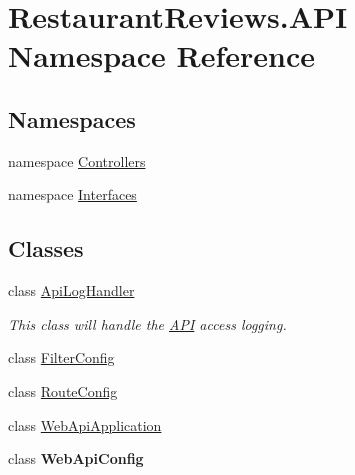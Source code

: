 \hypertarget{namespace_restaurant_reviews_1_1_a_p_i}{}\section{Restaurant\+Reviews.\+A\+PI Namespace Reference}
\label{namespace_restaurant_reviews_1_1_a_p_i}
\subsection*{Namespaces}
\begin{DoxyCompactItemize}
\item 
namespace \hyperlink{namespace_restaurant_reviews_1_1_a_p_i_1_1_controllers}{Controllers}
\item 
namespace \hyperlink{namespace_restaurant_reviews_1_1_a_p_i_1_1_interfaces}{Interfaces}
\end{DoxyCompactItemize}
\subsection*{Classes}
\begin{DoxyCompactItemize}
\item 
class \hyperlink{class_restaurant_reviews_1_1_a_p_i_1_1_api_log_handler}{Api\+Log\+Handler}
\begin{DoxyCompactList}\small\item\em This class will handle the \hyperlink{namespace_restaurant_reviews_1_1_a_p_i}{A\+PI} access logging. \end{DoxyCompactList}\item 
class \hyperlink{class_restaurant_reviews_1_1_a_p_i_1_1_filter_config}{Filter\+Config}
\item 
class \hyperlink{class_restaurant_reviews_1_1_a_p_i_1_1_route_config}{Route\+Config}
\item 
class \hyperlink{class_restaurant_reviews_1_1_a_p_i_1_1_web_api_application}{Web\+Api\+Application}
\item 
class {\bfseries Web\+Api\+Config}
\end{DoxyCompactItemize}

